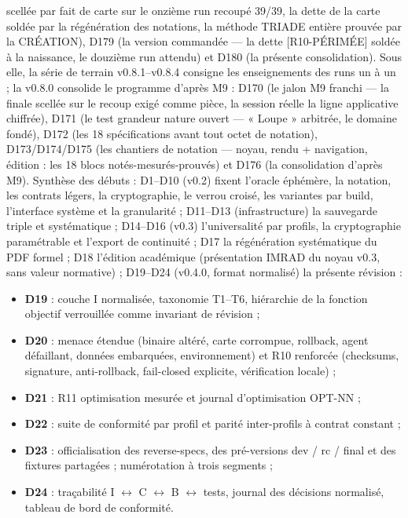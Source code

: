  scellée par fait de carte sur le onzième run recoupé 39/39,
la dette de la carte soldée par la régénération des notations, la méthode TRIADE
entière prouvée par la CRÉATION), D179 (la version  commandée
— la dette [R10-PÉRIMÉE] soldée à la naissance, le douzième run attendu) et
D180 (la présente consolidation). Sous elle, la série de terrain v0.8.1–v0.8.4
consigne les enseignements des runs un à un ; la v0.8.0 consolide le programme
d'après M9 : D170 (le jalon M9 franchi — la finale  scellée sur le
recoup exigé comme pièce, la session réelle la ligne applicative chiffrée),
D171 (le test grandeur nature ouvert — « Loupe » arbitrée, le domaine
 fondé), D172 (les 18 spécifications avant tout octet de notation),
D173/D174/D175 (les chantiers de notation — noyau, rendu + navigation, édition :
les 18 blocs notés-mesurés-prouvés) et D176 (la consolidation d'après M9).
Synthèse des débuts :
D1–D10 (v0.2) fixent l'oracle éphémère, la notation, les contrats légers, la
cryptographie, le verrou croisé, les variantes par build, l'interface système et la
granularité ; D11–D13 (infrastructure) la sauvegarde triple et systématique ; D14–D16
(v0.3) l'universalité par profils, la cryptographie paramétrable et l'export de
continuité ; D17 la régénération systématique du PDF formel ; D18 l'édition académique
(présentation IMRAD du noyau v0.3, sans valeur normative) ; D19–D24 (v0.4.0, format
normalisé) la présente révision :

\begin{itemize}[label={}, leftmargin=1.2em]
\item \textbf{D19} : couche I normalisée, taxonomie T1–T6, hiérarchie de la fonction
objectif verrouillée comme invariant de révision ;
\item \textbf{D20} : menace étendue (binaire altéré, carte corrompue, rollback,
agent défaillant, données embarquées, environnement) et R10 renforcée (checksums,
signature, anti-rollback, fail-closed explicite, vérification locale) ;
\item \textbf{D21} : R11 optimisation mesurée et journal d'optimisation OPT-NN ;
\item \textbf{D22} : suite de conformité par profil et parité inter-profils à contrat
constant ;
\item \textbf{D23} : officialisation des reverse-specs, des pré-versions dev / rc /
final et des fixtures partagées ; numérotation à trois segments ;
\item \textbf{D24} : traçabilité I $\leftrightarrow$ C $\leftrightarrow$ B
$\leftrightarrow$ tests, journal des décisions normalisé, tableau de bord de conformité.
\end{itemize}


